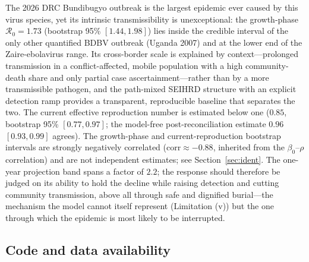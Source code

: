 \documentclass[preprint,12pt,numbers]{elsarticle}
\newcommand{\Reff}{\mathcal{R}}
\begin{document}
The 2026 DRC Bundibugyo outbreak is the largest epidemic ever caused by
this virus species, yet its intrinsic transmissibility is unexceptional:
the growth-phase $\Reff_0=1.73$ (bootstrap 95\% $[1.44,1.98]$) lies
inside the credible interval of the only other quantified BDBV outbreak
(Uganda 2007) and at the lower end of the Zaire-ebolavirus range. Its
cross-border scale is explained by context---prolonged transmission in a
conflict-affected, mobile population with a high community-death share
and only partial case ascertainment---rather than by a more
transmissible pathogen, and the path-mixed SEIHRD structure with an
explicit detection ramp provides a transparent, reproducible baseline
that separates the two. The current effective reproduction number is
estimated below one ($0.85$, bootstrap 95\% $[0.77,0.97]$; the
model-free post-reconciliation estimate $0.96$ $[0.93,0.99]$ agrees).
The growth-phase and current-reproduction bootstrap intervals are strongly
negatively correlated ($\mathrm{corr}\approx-0.88$, inherited from the
$\beta_0$--$\rho$ correlation) and are not independent estimates; see
Section~\ref{sec:ident}.
The one-year projection band spans a factor of $2.2$; the response
should therefore be judged on its ability to hold the decline while
raising detection and cutting community transmission, above all through
safe and dignified burial---the mechanism the model cannot itself
represent (Limitation (v)) but the one through which the epidemic is
most likely to be interrupted.
\subsection{Code and data availability}\label{sec:availability}
\end{document}
